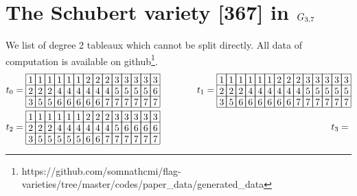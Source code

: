 \section{The Schubert variety [367] in $G_{{3},{7}}$}
\label{sec:sch367}

We list of degree 2 tableaux which cannot be split directly. All data of computation is available on github\footnote{https://github.com/somnathcmi/flag-varieties/tree/master/codes/paper\_data/generated\_data}.
\begin{align*}
    &t_0 = 
\begin{array}[c]{*{14}c}\cline{1-14}
\lr{1}&\lr{1}&\lr{1}&\lr{1}&\lr{1}&\lr{1}&\lr{2}&\lr{2}&\lr{2}&\lr{3}&\lr{3}&\lr{3}&\lr{3}&\lr{3}\\\cline{1-14}
\lr{2}&\lr{2}&\lr{2}&\lr{4}&\lr{4}&\lr{4}&\lr{4}&\lr{4}&\lr{4}&\lr{5}&\lr{5}&\lr{5}&\lr{5}&\lr{6}\\\cline{1-14}
\lr{3}&\lr{5}&\lr{5}&\lr{6}&\lr{6}&\lr{6}&\lr{6}&\lr{6}&\lr{7}&\lr{7}&\lr{7}&\lr{7}&\lr{7}&\lr{7}\\\cline{1-14}
\end{array}\hspace{30pt}
    &t_1 = 
\begin{array}[c]{*{14}c}\cline{1-14}
\lr{1}&\lr{1}&\lr{1}&\lr{1}&\lr{1}&\lr{1}&\lr{2}&\lr{2}&\lr{2}&\lr{3}&\lr{3}&\lr{3}&\lr{3}&\lr{3}\\\cline{1-14}
\lr{2}&\lr{2}&\lr{2}&\lr{4}&\lr{4}&\lr{4}&\lr{4}&\lr{4}&\lr{4}&\lr{5}&\lr{5}&\lr{5}&\lr{5}&\lr{5}\\\cline{1-14}
\lr{3}&\lr{5}&\lr{6}&\lr{6}&\lr{6}&\lr{6}&\lr{6}&\lr{6}&\lr{7}&\lr{7}&\lr{7}&\lr{7}&\lr{7}&\lr{7}\\\cline{1-14}
\end{array}\\
    &t_2 = \begin{array}[c]{*{14}c}\cline{1-14}
\lr{1}&\lr{1}&\lr{1}&\lr{1}&\lr{1}&\lr{1}&\lr{2}&\lr{2}&\lr{2}&\lr{3}&\lr{3}&\lr{3}&\lr{3}&\lr{3}\\\cline{1-14}
\lr{2}&\lr{2}&\lr{2}&\lr{4}&\lr{4}&\lr{4}&\lr{4}&\lr{4}&\lr{4}&\lr{5}&\lr{6}&\lr{6}&\lr{6}&\lr{6}\\\cline{1-14}
\lr{3}&\lr{5}&\lr{5}&\lr{5}&\lr{5}&\lr{5}&\lr{6}&\lr{6}&\lr{7}&\lr{7}&\lr{7}&\lr{7}&\lr{7}&\lr{7}\\\cline{1-14}
\end{array}\hspace{30pt}
    &t_3 = \begin{array}[c]{*{14}c}\cline{1-14}

\end{array}
\end{align*}
